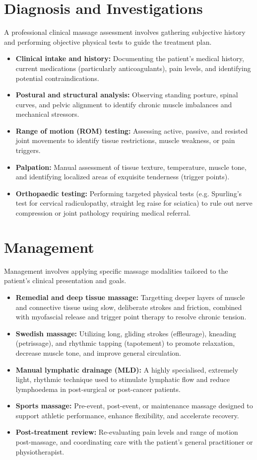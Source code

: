 \section*{Diagnosis and Investigations}
A professional clinical massage assessment involves gathering subjective history and performing objective physical tests to guide the treatment plan.
\begin{itemize}
    \item \textbf{Clinical intake and history:} Documenting the patient's medical history, current medications (particularly anticoagulants), pain levels, and identifying potential contraindications.
    \item \textbf{Postural and structural analysis:} Observing standing posture, spinal curves, and pelvic alignment to identify chronic muscle imbalances and mechanical stressors.
    \item \textbf{Range of motion (ROM) testing:} Assessing active, passive, and resisted joint movements to identify tissue restrictions, muscle weakness, or pain triggers.
    \item \textbf{Palpation:} Manual assessment of tissue texture, temperature, muscle tone, and identifying localized areas of exquisite tenderness (trigger points).
    \item \textbf{Orthopaedic testing:} Performing targeted physical tests (e.g. Spurling's test for cervical radiculopathy, straight leg raise for sciatica) to rule out nerve compression or joint pathology requiring medical referral.
\end{itemize}

\section*{Management}
Management involves applying specific massage modalities tailored to the patient's clinical presentation and goals.
\begin{itemize}
    \item \textbf{Remedial and deep tissue massage:} Targetting deeper layers of muscle and connective tissue using slow, deliberate strokes and friction, combined with myofascial release and trigger point therapy to resolve chronic tension.
    \item \textbf{Swedish massage:} Utilizing long, gliding strokes (effleurage), kneading (petrissage), and rhythmic tapping (tapotement) to promote relaxation, decrease muscle tone, and improve general circulation.
    \item \textbf{Manual lymphatic drainage (MLD):} A highly specialised, extremely light, rhythmic technique used to stimulate lymphatic flow and reduce lymphoedema in post-surgical or post-cancer patients.
    \item \textbf{Sports massage:} Pre-event, post-event, or maintenance massage designed to support athletic performance, enhance flexibility, and accelerate recovery.
    \item \textbf{Post-treatment review:} Re-evaluating pain levels and range of motion post-massage, and coordinating care with the patient's general practitioner or physiotherapist.
\end{itemize}

